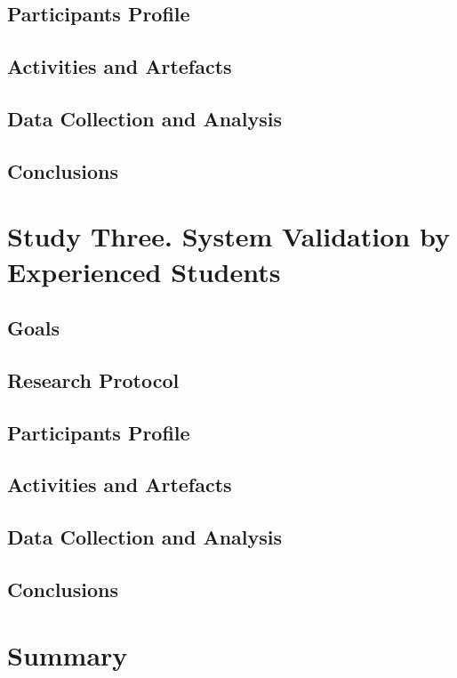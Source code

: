 \subsection{Participants Profile}
\subsection{Activities and Artefacts}
\subsection{Data Collection and Analysis}
\subsection{Conclusions}
 
\section{Study Three. System Validation by Experienced Students}
\subsection{Goals}
\subsection{Research Protocol}
\subsection{Participants Profile}
\subsection{Activities and Artefacts}
\subsection{Data Collection and Analysis}
\subsection{Conclusions}
 
\section{Summary}
